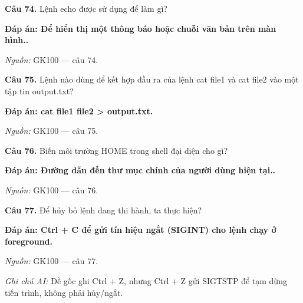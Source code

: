 \documentclass[11pt,a4paper]{article}
\begin{document}
\textbf{Câu 74.} Lệnh echo được sử dụng để làm gì?\par
{\color{answer}\textbf{Đáp án: Để hiển thị một thông báo hoặc chuỗi văn bản trên màn hình..}}\par
{\footnotesize\color{sourcegray}\textit{Nguồn:} GK100 — câu 74.\par}
\vspace{3pt}\par\noindent{\color{black!18}\rule{\linewidth}{0.3pt}}\par\medskip

\textbf{Câu 75.} Lệnh nào dùng để kết hợp đầu ra của lệnh cat file1 và cat file2 vào một tập tin output.txt?\par
{\color{answer}\textbf{Đáp án: cat file1 file2 \textgreater{} output.txt.}}\par
{\footnotesize\color{sourcegray}\textit{Nguồn:} GK100 — câu 75.\par}
\vspace{3pt}\par\noindent{\color{black!18}\rule{\linewidth}{0.3pt}}\par\medskip

\textbf{Câu 76.} Biến môi trường HOME trong shell đại diện cho gì?\par
{\color{answer}\textbf{Đáp án: Đường dẫn đến thư mục chính của người dùng hiện tại..}}\par
{\footnotesize\color{sourcegray}\textit{Nguồn:} GK100 — câu 76.\par}
\vspace{3pt}\par\noindent{\color{black!18}\rule{\linewidth}{0.3pt}}\par\medskip

\textbf{Câu 77.} Để hủy bỏ lệnh đang thi hành, ta thực hiện?\par
{\color{answer}\textbf{Đáp án: Ctrl + C để gửi tín hiệu ngắt (SIGINT) cho lệnh chạy ở foreground.}}\par
{\footnotesize\color{sourcegray}\textit{Nguồn:} GK100 — câu 77.\par}
{\footnotesize\color{sourcegray}\textit{Ghi chú AI:} Đề gốc ghi Ctrl + Z, nhưng Ctrl + Z gửi SIGTSTP để tạm dừng tiến trình, không phải hủy/ngắt.\par}
\vspace{3pt}\par\noindent{\color{black!18}\rule{\linewidth}{0.3pt}}\par\medskip
\end{document}
